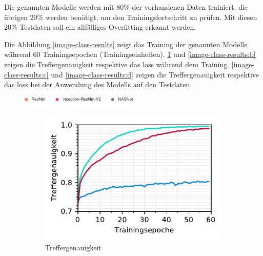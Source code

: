 Die genannten Modelle werden mit 80\% der vorhandenen Daten trainiert, die übrigen 20\% werden benötigt, um den Trainingsfortschritt zu prüfen. Mit diesen 20\% Testdaten soll ein allfälliges Overfitting erkannt werden.

Die Abbildung \ref{image-class-results} zeigt das Training der genannten Modelle während 60 Trainingsepochen (Trainingseinheiten). \ref{image-class-results:a} und \ref{image-class-results:b} zeigen die Treffergenauigkeit respektive das loss während dem Training.  \ref{image-class-results:c} und \ref{image-class-results:d} zeigen die Treffergenauigkeit respektive das loss bei der Anwendung des Modells auf den Testdaten. 

\begin{figure}[h!] 
  \captionsetup{width=.9\linewidth}
  \caption[Statistiken aus dem Training der Bild-basierten Klassifizierung von Rechnungen]{Statistiken aus dem Training der Bild-basierten Klassifizierung von Rechnungen mit den ResNet, Inception-ResNetV2 und NASNet Netzwerken.}
  \label{image-class-results} 
  \includegraphics[width=0.5\textwidth]{graphics/image-classification-results/legend.pdf}
  \begin{subfigure}[b]{0.5\linewidth}
    \centering
    \includegraphics[scale=1]{graphics/matplot/img-class__acc.pdf}
    \caption{Treffergenauigkeit} 
    \label{image-class-results:a} 
    \vspace{2ex}
  \end{subfigure}%
  \begin{subfigure}[b]{0.5\linewidth}
    \centering

\end{subfigure}
\end{figure}
